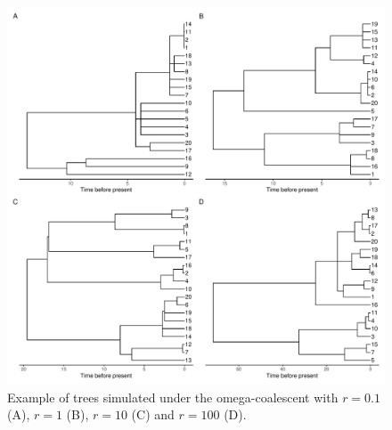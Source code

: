 \documentclass{article}
\begin{document}
\begin{figure}[!p]
\begin{center}
\includegraphics[width=15cm]{../run/figureTree.pdf}
\end{center}
\caption{Example of trees simulated under the omega-coalescent with $r=0.1$ (A),
$r=1$ (B), $r=10$ (C) and $r=100$ (D).
\label{fig:trees}}
\end{figure}
\end{document}
